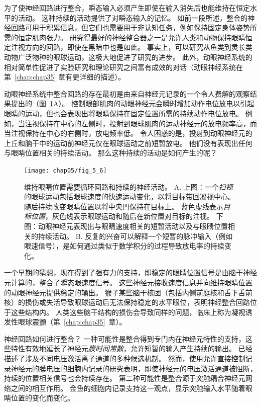 为了使神经回路进行整合，瞬态输入必须产生即使在输入消失后也能维持在恒定水平的活动。
这种持续的活动提供了对瞬态输入的记忆。
如前一段所述，整合的神经回路可用于积累信息，但它们也需要用于非认知任务，例如保持固定身体姿势所需的恒定肌肉张力。
研究得最好的神经整合器之一是允许人类和动物保持眼睛恒定注视方向的回路，即使在黑暗中也是如此。
事实上，可以研究从鱼类到灵长类动物广泛物种的眼球运动，这极大地促进了研究的进步。
此外，动眼神经系统的相对简单性促进了实验研究和理论研究之间富有成效的对话（动眼神经系统在第~\ref{chap:chap35} 章有更详细的描述）。


动眼神经系统中整合回路的存在最初是由来自神经元记录的一个令人费解的观察结果提出的（图~\ref{fig:5_6}A）。
控制眼部肌肉的动眼神经元会瞬时增加动作电位放电以引起眼睛的运动，但也会表现出将眼睛保持在固定位置所需的持续动作电位放电。
例如，当注视保持在中心的左侧时，投射到眼球肌肉的运动神经元的放电频率高，而当注视保持在中心的右侧时，放电频率低。
令人困惑的是，投射到动眼神经元的上丘和脑干中的运动前神经元仅在眼球运动之前短暂放电。
他们没有表现出任何与眼睛位置相关的持续活动。
那么这种持续的活动是如何产生的呢？


\begin{figure}[htbp]
	\centering
	\texttt{[image: chap05/fig\_5\_6]}
	\caption{维持眼睛位置需要循环回路和持续的神经活动。
		A. 上图：一个\textit{扫视}的眼球运动包括眼球速度的快速运动变化，以将目标带回凝视中心。
		随后持续改变眼睛位置以将中央凹保持在目标上。
		蓝色虚线表示\textit{目标位置}，灰色线表示眼球运动和随后在新位置对目标的注视。
		下图：动眼神经元表现出与眼睛速度相关的短暂活动以及与眼睛位置相关的持续活动。
		B. 反复的兴奋可以解释一个短暂的脉冲输入（例如眼速信号），是如何通过类似于数学积分的过程导致放电率的持续变化。}
	\label{fig:5_6}
\end{figure}


一个早期的猜想，现在得到了强有力的支持，即稳定的眼睛位置信号是由脑干神经元计算的，整合了瞬态眼速度信号。
这些神经元接收速度信息并向维持眼睛位置的动眼神经元提供稳定的输出。 
猴子某些脑干核团（包括内侧前庭核和舌下舌前核）的损伤或失活导致眼球运动后无法保持稳定的水平眼位，表明神经整合回路位于这些结构内。 
人类这些脑干结构的损伤会导致同样的问题，临床上称为凝视诱发性眼球震颤（第~\ref{chap:chap35}~章）。


神经回路如何进行整合？
一种可能性是整合得到专门内在神经元特性的支持，这些特性有效地延长了神经元\textit{膜时间常数}，允许短暂的输入产生持续的输出。
已经描述了涉及不同电压激活离子通道的多种候选机制。 
然而，使用允许直接控制记录神经元的膜电压的细胞内记录的研究表明，即使神经元的电压激活通道被阻断，持续的位置相关信号也会持续存在。 
第二种可能性是整合源于突触耦合神经元网络之间的相互作用。 
金鱼的细胞内记录支持这一观点，显示突触输入水平随着眼睛位置的变化而变化。


